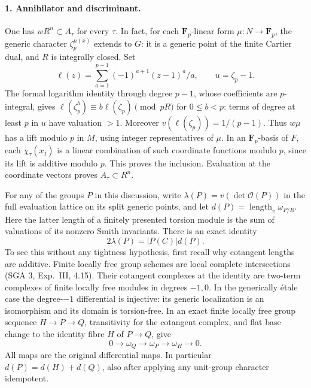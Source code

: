 \paragraph{1. Annihilator and discriminant.}
One has \(wR^n\subset A_\tau\) for every \(\tau\).
In fact, for each \(\mathbf F_p\)-linear form
\(\mu:N\to\mathbf F_p\), the generic character
\(\zeta_p^{\mu(x)}\) extends to \(G\): it is a generic point of
the finite Cartier dual, and \(R\) is integrally closed.
Set
\[
 \ell(z)=\sum_{a=1}^{p-1}(-1)^{a+1}(z-1)^a/a,\qquad
 u=\zeta_p-1 .
\]
The formal logarithm identity through degree \(p-1\), whose
coefficients are \(p\)-integral, gives
\(\ell(\zeta_p^b)\equiv b\ell(\zeta_p)\pmod{pR}\)
for \(0\le b<p\): terms of degree at least \(p\) in \(u\)
have valuation \(>1\). Moreover \(v(\ell(\zeta_p))=1/(p-1)\).
Thus \(w\mu\) has a lift modulo \(p\) in \(M\), using integer
representatives of \(\mu\). In an \(\mathbf F_p\)-basis of \(F\),
each \(\chi_\tau(x_j)\) is a linear combination of such
coordinate functions modulo \(p\), since its lift is additive
modulo \(p\). This proves the inclusion. Evaluation at the
coordinate vectors proves \(A_\tau\subset R^n\).

For any of the groups \(P\) in this discussion, write
\(\lambda(P)=v(\det\mathcal O(P))\) in the full evaluation
lattice on its split generic points, and let
\(d(P)=\operatorname{length}_v\omega_{P/R}\).
Here the latter length of a finitely presented torsion module
is the sum of valuations of its nonzero Smith invariants.
There is an exact identity
\begin{equation}\label{eq:torsion-character-discriminant}
  2\lambda(P)=|P(C)|d(P).
\end{equation}
To see this without any tightness hypothesis, first recall why
cotangent lengths are additive. Finite locally free group schemes
are local complete intersections (SGA 3, Exp.~III, 4.15).
Their cotangent complexes at the identity are two-term complexes
of finite locally free modules in degrees \(-1,0\).
In the generically \'{e}tale case the degree-\(-1\)
differential is injective: its generic localization is an
isomorphism and its domain is torsion-free. In an exact finite
locally free group sequence \(H\to P\to Q\), transitivity for
the cotangent complex, and flat base change to the identity
fibre \(H\) of \(P\to Q\), give
\[
 0\longrightarrow\omega_Q\longrightarrow\omega_P
       \longrightarrow\omega_H\longrightarrow0 .
\]
All maps are the original differential maps. In particular
\(d(P)=d(H)+d(Q)\), also after applying any unit-group
character idempotent.

